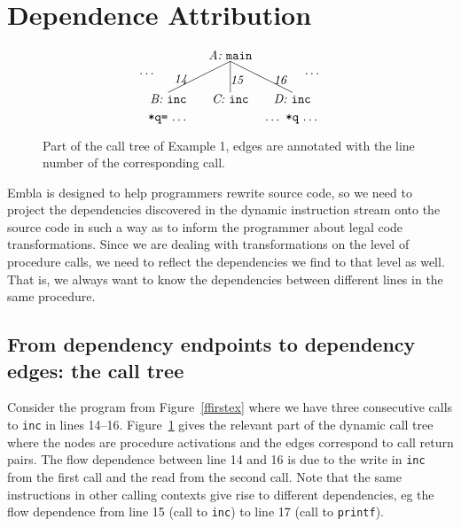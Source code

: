 \documentclass{acm_proc_article-sp}
\begin{document}


\section{Dependence Attribution}

\begin{figure} \small
\hrulefill
\[
\begin{picture}(160,60)(70,15)
\put(120,65){\makebox(60,10)[c]{\it A:\ \tt main}}
\put(150,65){\line(-2,-1){50}}
\put(150,65){\line( 0,-1){25}}
\put(150,65){\line( 2,-1){50}}
\put(95,45){\makebox(20,10)[r]{\it 14}}
\put(150,45){\makebox(20,10)[l]{\it 15}}
\put(185,45){\makebox(20,10)[l]{\it 16}}
\put(70,50){\makebox(20,10)[r]{\ldots}}
\put(210,50){\makebox(20,10)[l]{\ldots}}
\put(170,30){\makebox(60,10)[c]{\it D:\ \tt inc}}
\put(120,30){\makebox(60,10)[c]{\it C:\ \tt inc}}
\put(70,30){\makebox(60,10)[c]{\it B:\ \tt inc}}
\put(70,15){\makebox(60,10)[cb]{{\tt *q=}\ \ldots}}
\put(170,15){\makebox(60,10)[cb]{\ldots\ {\tt *q}\ \ldots}}
\end{picture}
\]
\hrulefill
\caption{Part of the call tree of Example 1, edges are annotated 
with the line number of the corresponding call.} 
\label{ffextree}
\end{figure}


Embla is designed to help programmers 
rewrite source code, so we need to project 
the dependencies discovered in the dynamic instruction stream onto the 
source code in such a way as to inform the programmer about legal code 
transformations. Since we are dealing with transformations on the level of
procedure calls, we need to reflect the dependencies we find to that level 
as well. That is, we always want to know the dependencies between different 
lines in the same procedure.

\subsection{From dependency endpoints to dependency edges: the call tree}

Consider the program from Figure~\ref{ffirstex} where we have three consecutive
calls to {\tt inc} in lines 14--16. Figure~\ref{ffextree} gives the relevant 
part of the dynamic call tree where the nodes are procedure activations and the 
edges correspond to call
return pairs. The flow dependence between line 14 and 16 is due 
to the write in {\tt inc} from the first call and the read from the second call.
Note that the same instructions in other calling contexts give rise to 
different dependencies, eg the flow dependence from line 15 (call to {\tt inc})
to line 17 (call to {\tt printf}).
\end{document}
